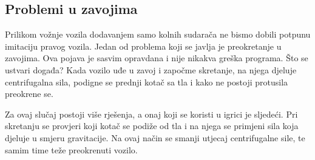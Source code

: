 \subsection{Problemi u zavojima}
Prilikom vožnje vozila dodavanjem samo kolnih sudarača ne bismo dobili potpunu imitaciju pravog vozila. Jedan od problema koji se javlja je preokretanje u zavojima. Ova pojava je sasvim opravdana i nije nikakva greška programa. Što se ustvari događa? Kada vozilo uđe u zavoj i započme skretanje, na njega djeluje centrifugalna sila, podigne se prednji kotač sa tla i kako ne postoji protusila preokrene se. \par
Za ovaj slučaj postoji više rješenja, a onaj koji se koristi u igrici je sljedeći. Pri skretanju se provjeri koji kotač se podiže od tla i na njega se primjeni sila koja djeluje u smjeru gravitacije. Na ovaj način se smanji utjecaj centrifugalne sile, te samim time teže preokrenuti vozilo.
